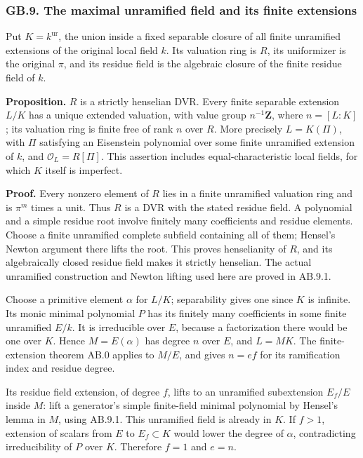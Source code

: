 \documentclass[
  11pt,
]{article}
\begin{document}
\subsubsection{GB.9. The maximal unramified field and its finite
extensions}\label{gb.9.-the-maximal-unramified-field-and-its-finite-extensions}

Put \(K=k^{\mathrm{ur}}\), the union inside a fixed separable closure of
all finite unramified extensions of the original local field \(k\). Its
valuation ring is \(R\), its uniformizer is the original \(\pi\), and
its residue field is the algebraic closure of the finite residue field
of \(k\).

\textbf{Proposition.} \(R\) is a strictly henselian DVR. Every finite
separable extension \(L/K\) has a unique extended valuation, with value
group \(n^{-1}\mathbf Z\), where \(n=[L:K]\); its valuation ring is
finite free of rank \(n\) over \(R\). More precisely \(L=K(\Pi)\), with
\(\Pi\) satisfying an Eisenstein polynomial over some finite unramified
extension of \(k\), and \(\mathcal O_L=R[\Pi]\). This assertion includes
equal-characteristic local fields, for which \(K\) itself is imperfect.

\textbf{Proof.} Every nonzero element of \(R\) lies in a finite
unramified valuation ring and is \(\pi^m\) times a unit. Thus \(R\) is a
DVR with the stated residue field. A polynomial and a simple residue
root involve finitely many coefficients and residue elements. Choose a
finite unramified complete subfield containing all of them; Hensel's
Newton argument there lifts the root. This proves henselianity of \(R\),
and its algebraically closed residue field makes it strictly henselian.
The actual unramified construction and Newton lifting used here are
proved in AB.9.1.

Choose a primitive element \(\alpha\) for \(L/K\); separability gives
one since \(K\) is infinite. Its monic minimal polynomial \(P\) has its
finitely many coefficients in some finite unramified \(E/k\). It is
irreducible over \(E\), because a factorization there would be one over
\(K\). Hence \(M=E(\alpha)\) has degree \(n\) over \(E\), and \(L=MK\).
The finite-extension theorem AB.0 applies to \(M/E\), and gives \(n=ef\)
for its ramification index and residue degree.

Its residue field extension, of degree \(f\), lifts to an unramified
subextension \(E_f/E\) inside \(M\): lift a generator's simple
finite-field minimal polynomial by Hensel's lemma in \(M\), using
AB.9.1. This unramified field is already in \(K\). If \(f>1\), extension
of scalars from \(E\) to \(E_f\subset K\) would lower the degree of
\(\alpha\), contradicting irreducibility of \(P\) over \(K\). Therefore
\(f=1\) and \(e=n\).
\end{document}
